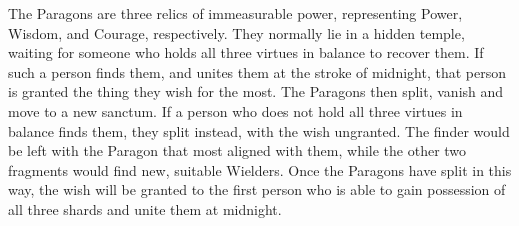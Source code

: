 \documentclass[blue]{Katmeers}
\begin{document}
\name{\bParagons{}}

The Paragons are three relics of immeasurable power, representing Power, Wisdom, and Courage, respectively.  They normally lie in a hidden temple, waiting for someone who holds all three virtues in balance to recover them.  If such a person finds them, and unites them at the stroke of midnight, that person is granted the thing they wish for the most.  The Paragons then split, vanish and move to a new sanctum.  If a person who does not hold all three virtues in balance finds them, they split instead, with the wish ungranted.  The finder would be left with the Paragon that most aligned with them, while the other two fragments would find new, suitable Wielders. Once the Paragons have split in this way, the wish will be granted to the first person who is able to gain possession of all three shards and unite them at midnight.
\end{document}
